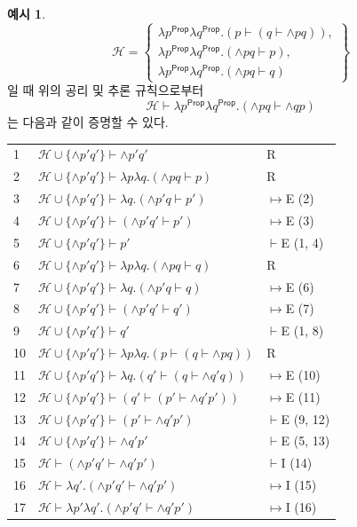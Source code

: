\documentclass[10pt,twocolumn]{article}
\theoremstyle{definition}
\newtheorem{example}[theorem]{예시}
\newcommand{\Prop}{\mathsf{Prop}}
\begin{document}
\begin{example} \label{example:proof}
	$$\mathcal H = \left\{\begin{array}{l}
		\lambda p^\Prop\lambda q^\Prop.(p\vdash(q\vdash {\land}pq)),\\
		\lambda p^\Prop\lambda q^\Prop.({\land}pq\vdash p),\\
		\lambda p^\Prop\lambda q^\Prop.({\land}pq\vdash q)
	\end{array}\right\}$$
	일 때 위의 공리 및 추론 규칙으로부터 $$\mathcal H\vdash \lambda p^\Prop\lambda q^\Prop.({\land}pq\vdash{\land}qp)$$는 다음과 같이 증명할 수 있다.
	
	\begin{table}[H] \centering\small
		\begin{tabular}{lll}
			1 & $\mathcal H\cup\{{\land}p'q'\}\vdash {\land}p'q'$ & R \\
			2 & $\mathcal H\cup\{{\land}p'q'\}\vdash \lambda p\lambda q.({\land}pq\vdash p)$ & R \\
			3 & $\mathcal H\cup\{{\land}p'q'\}\vdash \lambda q.({\land}p'q\vdash p')$ & $\mapsto$E (2) \\
			4 & $\mathcal H\cup\{{\land}p'q'\}\vdash ({\land}p'q'\vdash p')$ & $\mapsto$E (3) \\
			5 & $\mathcal H\cup\{{\land}p'q'\}\vdash p'$ & $\vdash$E (1, 4) \\
			6 & $\mathcal H\cup\{{\land}p'q'\}\vdash \lambda p\lambda q.({\land}pq\vdash q)$ & R \\
			7 & $\mathcal H\cup\{{\land}p'q'\}\vdash \lambda q.({\land}p'q\vdash q)$ & $\mapsto$E (6) \\
			8 & $\mathcal H\cup\{{\land}p'q'\}\vdash ({\land}p'q'\vdash q')$ & $\mapsto$E (7) \\
			9 & $\mathcal H\cup\{{\land}p'q'\}\vdash q'$ & $\vdash$E (1, 8) \\
			10 & $\mathcal H\cup\{{\land}p'q'\}\vdash \lambda p\lambda q.(p\vdash (q\vdash{\land}pq))$ & R \\
			11 & $\mathcal H\cup\{{\land}p'q'\}\vdash \lambda q.(q'\vdash(q\vdash{\land}q'q))$ & $\mapsto$E (10) \\
			12 & $\mathcal H\cup\{{\land}p'q'\}\vdash (q'\vdash(p'\vdash{\land}q'p'))$ & $\mapsto$E (11) \\
			13 & $\mathcal H\cup\{{\land}p'q'\}\vdash (p'\vdash{\land}q'p')$ & $\vdash$E (9, 12) \\
			14 & $\mathcal H\cup\{{\land}p'q'\}\vdash {\land}q'p'$ & $\vdash$E (5, 13) \\
			15 & $\mathcal H\vdash ({\land}p'q'\vdash {\land}q'p')$ & $\vdash$I (14) \\
			16 & $\mathcal H\vdash \lambda q'.({\land}p'q'\vdash {\land}q'p')$ & $\mapsto$I (15) \\
			17 & $\mathcal H\vdash \lambda p'\lambda q'.({\land}p'q'\vdash {\land}q'p')$ & $\mapsto$I (16) \\
		\end{tabular}
	\end{table}
	

\end{example}
\end{document}
